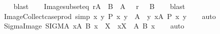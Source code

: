 \begin{isabellebody}
\ \ \isamarkupfalse%
\ blast\isanewline
\ \ \isamarkupfalse%
%
\endisatagproof
{\isafoldproof}%
%
\isadelimproof
\isanewline
%
\endisadelimproof
\isanewline
{}\isamarkupfalse%
\ Image{\isacharunderscore}{\kern0pt}subset{\isacharunderscore}{\kern0pt}eq{\isacharcolon}{\kern0pt}\ {\isachardoublequoteopen}r{\isacharbackquote}{\kern0pt}{\isacharbackquote}{\kern0pt}A\ {\isasymsubseteq}\ B\ {\isasymlongleftrightarrow}\ A\ {\isasymsubseteq}\ {\isacharminus}{\kern0pt}\ {\isacharparenleft}{\kern0pt}{\isacharparenleft}{\kern0pt}r{\isasyminverse}{\isacharparenright}{\kern0pt}\ {\isacharbackquote}{\kern0pt}{\isacharbackquote}{\kern0pt}\ {\isacharparenleft}{\kern0pt}{\isacharminus}{\kern0pt}\ B{\isacharparenright}{\kern0pt}{\isacharparenright}{\kern0pt}{\isachardoublequoteclose}\isanewline
%
\isadelimproof
\ \ %
\endisadelimproof
%
\isatagproof
{}\isamarkupfalse%
\ blast%
\endisatagproof
{\isafoldproof}%
%
\isadelimproof
\isanewline
%
\endisadelimproof
\isanewline
{}\isamarkupfalse%
\ Image{\isacharunderscore}{\kern0pt}Collect{\isacharunderscore}{\kern0pt}case{\isacharunderscore}{\kern0pt}prod\ {\isacharbrackleft}{\kern0pt}simp{\isacharbrackright}{\kern0pt}{\isacharcolon}{\kern0pt}\ {\isachardoublequoteopen}{\isacharbraceleft}{\kern0pt}{\isacharparenleft}{\kern0pt}x{\isacharcomma}{\kern0pt}\ y{\isacharparenright}{\kern0pt}{\isachardot}{\kern0pt}\ P\ x\ y{\isacharbraceright}{\kern0pt}\ {\isacharbackquote}{\kern0pt}{\isacharbackquote}{\kern0pt}\ A\ {\isacharequal}{\kern0pt}\ {\isacharbraceleft}{\kern0pt}y{\isachardot}{\kern0pt}\ {\isasymexists}x{\isasymin}A{\isachardot}{\kern0pt}\ P\ x\ y{\isacharbraceright}{\kern0pt}{\isachardoublequoteclose}\isanewline
%
\isadelimproof
\ \ %
\endisadelimproof
%
\isatagproof
{}\isamarkupfalse%
\ auto%
\endisatagproof
{\isafoldproof}%
%
\isadelimproof
\isanewline
%
\endisadelimproof
\isanewline
{}\isamarkupfalse%
\ Sigma{\isacharunderscore}{\kern0pt}Image{\isacharcolon}{\kern0pt}\ {\isachardoublequoteopen}{\isacharparenleft}{\kern0pt}SIGMA\ x{\isacharcolon}{\kern0pt}A{\isachardot}{\kern0pt}\ B\ x{\isacharparenright}{\kern0pt}\ {\isacharbackquote}{\kern0pt}{\isacharbackquote}{\kern0pt}\ X\ {\isacharequal}{\kern0pt}\ {\isacharparenleft}{\kern0pt}{\isasymUnion}x{\isasymin}X\ {\isasyminter}\ A{\isachardot}{\kern0pt}\ B\ x{\isacharparenright}{\kern0pt}{\isachardoublequoteclose}\isanewline
%
\isadelimproof
\ \ %
\endisadelimproof
%
\isatagproof
{}\isamarkupfalse%
\ auto%
\endisatagproof
{\isafoldproof}%
%
\isadelimproof
\isanewline

\end{isabellebody}
